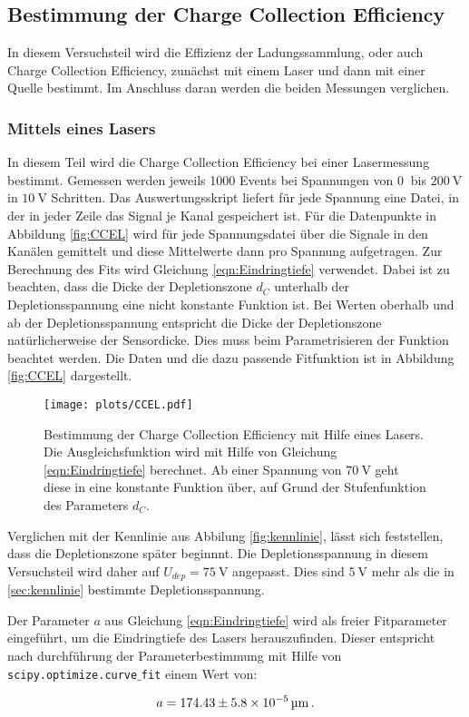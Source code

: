 \subsection{Bestimmung der Charge Collection Efficiency}
\label{sec:CCE}
In diesem Versuchsteil wird die Effizienz der Ladungssammlung, oder auch 
Charge Collection Efficiency, zunächst mit einem Laser und dann mit 
einer Quelle bestimmt. Im Anschluss daran werden die beiden Messungen 
verglichen.

\subsubsection{Mittels eines Lasers}
\label{sec:CCEL}

In diesem Teil wird die Charge Collection Efficiency bei einer 
Lasermessung bestimmt. Gemessen werden jeweils 1000 Events 
bei Spannungen von $\SI{0}{}$ bis $\SI{200}{\volt}$ in 
$\SI{10}{\volt}$ Schritten. Das Auswertungsskript liefert für jede 
Spannung eine Datei, in der in jeder Zeile das Signal je 
Kanal gespeichert ist. Für die Datenpunkte in Abbildung 
\ref{fig:CCEL} wird für jede Spannungsdatei über die Signale in 
den Kanälen gemittelt und diese Mittelwerte dann pro Spannung 
aufgetragen. Zur Berechnung des Fits wird Gleichung
\eqref{eqn:Eindringtiefe} verwendet. Dabei ist zu beachten, dass 
die Dicke der Depletionszone $d_C$ unterhalb der Depletionsspannung 
eine nicht konstante Funktion ist. Bei Werten oberhalb und ab der 
Depletionsspannung entspricht die Dicke der Depletionszone natürlicherweise 
der Sensordicke. Dies muss beim Parametrisieren der Funktion 
beachtet werden. Die Daten und die dazu passende Fitfunktion ist in 
Abbildung \ref{fig:CCEL} dargestellt.

\begin{figure}[H]
  \centering
  \texttt{[image: plots/CCEL.pdf]}
  \caption{Bestimmung der Charge Collection Efficiency mit Hilfe eines 
  Lasers. Die Ausgleichsfunktion wird mit Hilfe von Gleichung 
  \eqref{eqn:Eindringtiefe} berechnet. Ab einer Spannung von $\SI{70}{\volt}$ geht 
  diese in eine konstante Funktion über, auf Grund der Stufenfunktion des 
  Parameters $d_C$.}
  \label{fig:kalibfunktion}
\end{figure}

Verglichen mit der Kennlinie aus Abbilung \ref{fig:kennlinie}, lässt sich 
feststellen, dass die Depletionszone später beginnnt. Die Depletionsspannung 
in diesem Versuchsteil wird daher auf $U_{dep} = \SI{75}{\volt}$ angepasst. Dies 
sind $\SI{5}{\volt}$ mehr als die in \ref{sec:kennlinie} bestimmte 
Depletionsspannung. \par 

Der Parameter $a$ aus Gleichung \eqref{eqn:Eindringtiefe} wird als freier 
Fitparameter eingeführt, um die Eindringtiefe des Lasers herauszufinden. 
Dieser entspricht nach durchführung der Parameterbestimmung mit Hilfe 
von \texttt{scipy.optimize.curve$\_$fit} einem Wert von:

\begin{align*}
    a = \SI[parse-numbers=false]{174.43 \pm 5.8 \times 10^{-5}}{\micro\meter} \, .
\end{align*}
